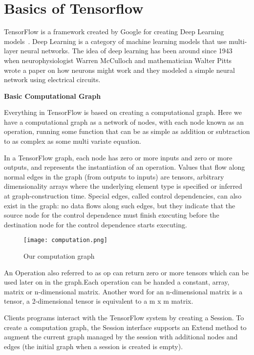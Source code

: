 	
	\section{Basics of Tensorflow}
	\label{sec:Basics of Tensorflow}
		TensorFlow is a framework created by Google for creating Deep Learning models~\cite{abadi2016tensorflow}. Deep Learning is a category of machine learning models that use multi-layer neural networks. The idea of deep learning has been around since 1943 when neurophysiologist Warren McCulloch and mathematician Walter Pitts wrote a paper on how neurons might work and they modeled a simple neural network using electrical circuits.
		
		\newpage
		\noindent\textbf{Basic Computational Graph}

		\noindent Everything in TensorFlow is based on creating a computational graph. Here we have a computational graph as a network of nodes, with each node known as an operation, running some function that can be as simple as addition or subtraction to as complex as some multi variate equation.
		
		In a TensorFlow graph, each node has zero or more inputs and zero or more outputs, and represents the instantiation of an operation. Values that flow along normal edges in the graph (from outputs to inputs) are tensors,
		arbitrary dimensionality arrays where the underlying element type is specified or inferred at graph-construction time. Special  edges,  called
		control  dependencies, can also exist in the graph:  no data flows along such edges, but they indicate that the source node for the control dependence  must  finish  executing  before  the  destination node for the control dependence starts executing.
		
		\begin{figure}[htbp]
			\centering
			\texttt{[image: computation.png]}
			\caption{Our computation graph\label{Our computation graph}}
		\end{figure}
		
		An Operation also referred to as op can return zero or more tensors which can be used later on in the graph.Each operation can be handed a constant, array, matrix or n-dimensional matrix. Another word for an n-dimensional matrix is a tensor, a 2-dimensional tensor is equivalent to a m x m matrix.
		
		Clients programs interact with the TensorFlow system by creating a
		Session. To create a computation graph, the Session interface supports an
		Extend method to augment the current graph managed by the session with additional nodes and edges (the initial graph when a session is created is empty).
		

